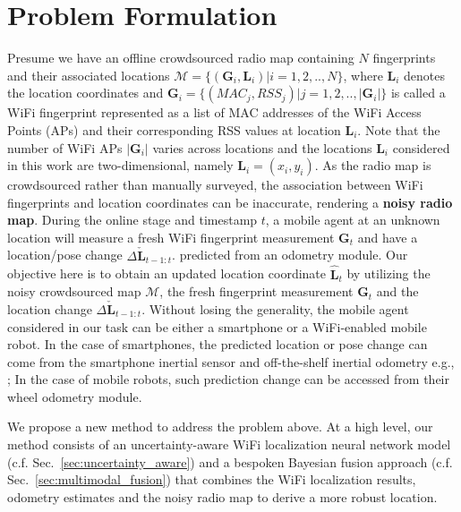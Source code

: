 \section{Problem Formulation}
Presume we have an offline crowdsourced radio map containing $N$ fingerprints and their associated locations $\mathcal{M} = \{(\mathbf{G}_i, \mathbf{L}_i)|i=1,2,..,N\}$, where $\mathbf{L}_i$ denotes the location coordinates and $\mathbf{G}_i = \{(MAC_j, RSS_j)|j=1,2,..,|\mathbf{G}_i|\}$ is called a WiFi fingerprint represented as a list of MAC addresses of the WiFi Access Points (APs) and their corresponding RSS values at location $\mathbf{L}_i$. Note that the number of WiFi APs $|\mathbf{G}_i|$ varies across locations and the locations $\mathbf{L}_i$ considered in this work are two-dimensional, namely $\mathbf{L}_i= (x_i, y_i)$. As the radio map is crowdsourced rather than manually surveyed, the association between WiFi fingerprints and location coordinates can be inaccurate, rendering a \textbf{noisy radio map}.
During the online stage and timestamp $t$, a mobile agent at an unknown location will measure a fresh WiFi fingerprint measurement $\mathbf{G}_t$ and have a location/pose change $\Delta\mathbf{\check{L}}_{t-1:t}$. predicted from an odometry module. Our objective here is to obtain an updated location coordinate $\mathbf{\hat{L}}_t$ by utilizing the noisy crowdsourced map $\mathcal{M}$, the fresh fingerprint measurement $\mathbf{G}_t$ and the location change $\Delta\mathbf{\check{L}}_{t-1:t}$. Without losing the generality, the mobile agent considered in our task can be either a smartphone or a WiFi-enabled mobile robot. In the case of smartphones, the predicted location or pose change can come from the smartphone inertial sensor and off-the-shelf inertial odometry e.g., \cite{imupdr2013Li};
In the case of mobile robots, such prediction change can be accessed from their wheel odometry module.

We propose a new method to address the problem above. At a high level, our method consists of an uncertainty-aware WiFi localization neural network model (c.f. Sec.~\ref{sec:uncertainty_aware}) and a bespoken Bayesian fusion approach (c.f. Sec.~\ref{sec:multimodal_fusion}) that combines the WiFi localization results, odometry estimates and the noisy radio map to derive a more robust location. 


